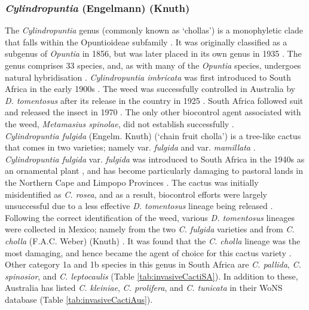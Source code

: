 \subsubsection{\textit{Cylindropuntia} (Engelmann) (Knuth)}
The \textit{Cylindropuntia} genus (commonly known as `chollas') is a monophyletic clade that falls within the Opuntioideae subfamily \citep{Anderson2001}. It was originally classified as a subgenus of \textit{Opuntia} in 1856, but was later placed in its own genus in 1935 \citep{Anderson2001}. The genus comprises 33 species, and, as with many of the \textit{Opuntia} species, undergoes natural hybridisation \citep{Anderson2001}. 
\textit{Cylindropuntia imbricata} was first introduced to South Africa in the early 1900s \citep{Moran1991BiologicalAfrica}. 
The weed was successfully controlled in Australia by \textit{D. tomentosus} after its release in the country in 1925 \citep{Dodd1940}. South Africa followed suit and released the insect in 1970 \citep{Moran1991BiologicalAfrica}. The only other biocontrol agent associated with the weed, \textit{Metamasius spinolae}, did not establish successfully \citep{Klein2011}. \\
\textit{Cylindropuntia fulgida} (Engelm. Knuth) (‘chain fruit cholla’) is a tree-like cactus that comes in two varieties; namely var. \textit{fulgida} and var. \textit{mamillata} \citep{Anderson2001}. \textit{Cylindropuntia fulgida} var. \textit{fulgida} was introduced to South Africa in the 1940s as an ornamental plant \citep{DeBeer1986}, and has become particularly damaging to pastoral lands in the Northern Cape and Limpopo Provinces \citep{Moran1991BiologicalAfrica,Paterson2011BiologicalAfrica}. The cactus was initially misidentified as \textit{C. rosea}, and as a result, biocontrol efforts were largely unsuccessful due to a less effective \textit{D. tomentosus} lineage being released \citep{Paterson2011BiologicalAfrica}. Following the correct identification of the weed, various \textit{D. tomentosus} lineages were collected in Mexico; namely from the two \textit{C. fulgida} varieties and from \textit{C. cholla} (F.A.C. Weber) (Knuth) \citep{Paterson2011BiologicalAfrica}. It was found that the \textit{C. cholla} lineage was the most damaging, and hence became the agent of choice for this cactus variety \citep{Mathenge2009a}. Other category 1a and 1b species in this genus in South Africa are \textit{C. pallida}, \textit{C. spinosior}, and \textit{C. leptocaulis} (Table \ref{tab:invasiveCactiSA}). In addition to these, Australia has listed \textit{C. kleiniae}, \textit{C. prolifera}, and \textit{C. tunicata} in their WoNS database (Table \ref{tab:invasiveCactiAus}).